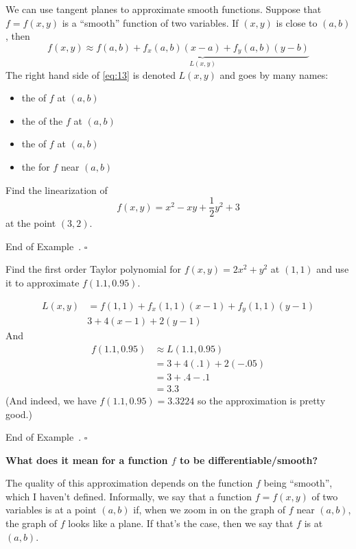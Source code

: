 \documentclass[10pt]{article}
\theoremstyle{definition}
\newtheorem{example}[theorem]{Example}
\renewenvironment{example}
{\begin{oldexample}}
  {\par\smallskip\hfill   End of Example~\theexample. $\square$    \par\end{oldexample}}
\newcommand{\vt}{\vskip 5mm} %
\newcommand{\Fl}{\vt\noindent\textbf} %
\newcommand{\1}[1]{\textbf{1}_{\left[#1\right]}} %
\newcommand{\dempfcolor}[1]{{\color{RoyalBlue}#1}}
\newcommand{\demph}[1]{\dempfcolor{{\sl #1}}}
\begin{document}
We can use tangent planes to approximate smooth functions. Suppose that $f=f(x,y)$ is
a ``smooth'' function of two variables. If $(x,y)$ is close to $(a,b)$, then
\begin{equation}\label{eq:13}
  f(x,y) \approx \underbrace{f(a,b) + f_{x}(a,b)(x-a)+ f_{y}(a,b)(y-b)}_{L(x,y)}
\end{equation}
The right hand side of \cref{eq:13} is denoted $L(x,y)$ and goes by many
names:
\begin{itemize}
  \item the \demph{linear approximation} of $f$ at $(a,b)$
  \item the \demph{tangent plane approximation} of the $f$ at $(a,b)$
  \item the \demph{linearization} of $f$ at $(a,b) $
  \item the \demph{first order Taylor approximation} for $f$ near $(a,b)$
\end{itemize}


\begin{example}
  Find the linearization of
  \begin{equation*}
    f(x,y) = x^{2}-xy+\frac{1}{2}y^{2}+3
  \end{equation*}
  at the point $(3,2)$.
\end{example}

\begin{example}
  Find the first order Taylor polynomial for $f(x,y) = 2x^{2}+y^{2}$ at
  $(1,1)$ and use it to approximate $f(1.1,0.95)$.

  \begin{align*}
    L(x,y) 
    &= f(1,1)+f_{x}(1,1)(x-1)+f_{y}(1,1)(y-1)\\
    &3+4(x-1)+2(y-1)
  \end{align*}
  And
  \begin{align*}
    f(1.1,0.95) 
    &\approx L(1.1,0.95)\\
    &=3+4(.1)+2(-.05)\\
    &=3+.4-.1\\
    &=3.3
  \end{align*}
  (And indeed, we have $f(1.1,0.95)=3.3224$ so the approximation is pretty
  good.)
\end{example}

\Fl{What does it mean for a function $f$ to be differentiable/smooth?}

The quality of this approximation depends on the function $f$ being
``smooth'', which I haven't defined. Informally, we say that a
function $f=f(x,y)$ of two variables is \demph{differentiable} at a point
$(a,b)$ if, when we zoom in on the graph of $f$ near $(a,b)$, the
graph of $f$ looks like a plane. If that's the case, then we say that
$f$ is \demph{differentiable} at $(a,b)$.
\end{document}
